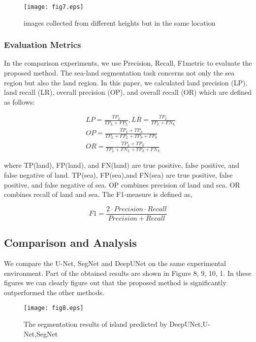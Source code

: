 \documentclass[conference]{IEEEtran}
\begin{document}
\begin{figure}[htbp]
\setlength{\abovecaptionskip}{0pt}
\setlength{\belowcaptionskip}{-10pt}
\centering
\texttt{[image: fig7.eps]}
\caption{images collected from different heights but in the same location}
\label{fig7}
\end{figure}

\subsubsection{Evaluation Metrics}
In the comparison experiments, we use Precision, Recall, F1metric to evaluate the proposed method. The sea-land segmentation task concerns not only the sea region but also the land region. In this paper, we calculated land precision (LP), land recall (LR), overall precision (OP), and overall recall (OR) which are defined as follows:

\begin{align}
& LP=\frac{TP_{L}}{TP_{L}+FP_{L}},LR=\frac{TP_{L}}{TP_{L}+FN_{L}} \\
& OP=\frac{TP_{L}+TP_{S}}{TP_{L}+FP_{L}+TP_{S}+FP_{S}} \\
& OR=\frac{TP_{L}+TP_{S}}{TP_{L}+FN_{L}+TP_{S}+FN_{S}} 
\end{align}

where TP(land), FP(land), and FN(land) are true positive, false positive, and false negative of land. TP(sea), FP(sea),and FN(sea) are true positive, false positive, and false negative of sea. OP combines precision of land and sea. OR combines recall of land and sea. The F1-measure is defined as,

\begin{equation}
F1=\frac{2\cdot Precision\cdot Recall}{Precision+Recall}
\end{equation}

\subsection{Comparison and Analysis}
We compare the U-Net, SegNet and DeepUNet on the same experimental environment. Part of the obtained results are shown in Figure 8, 9, 10, 1. In these figures we can clearly figure out that the proposed method is significantly outperformed the other methods.

\begin{figure}[htbp]
\setlength{\abovecaptionskip}{0pt}
\setlength{\belowcaptionskip}{-10pt}
\centering
\texttt{[image: fig8.eps]}
\caption{The segmentation results of island predicted by DeepUNet,U-Net,SegNet}
\label{fig8}
\end{figure}
\end{document}
